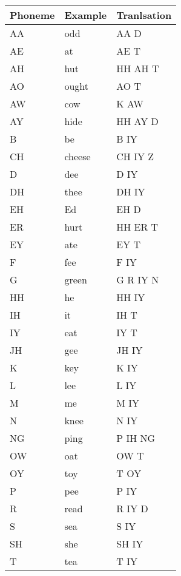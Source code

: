 \begin{table}
    \begin{tabular}{|l|l|l|}
    \hline
    Phoneme & Example & Tranlsation \\ \hline
    AA      & odd     & AA D        \\
    AE      & at      & AE T        \\
    AH      & hut     & HH AH T     \\
    AO      & ought   & AO T        \\
    AW      & cow     & K AW        \\
    AY      & hide    & HH AY D     \\
    B       & be      & B IY        \\
    CH      & cheese  & CH IY Z     \\
    D       & dee     & D IY        \\
    DH      & thee    & DH IY       \\
    EH      & Ed      & EH D        \\
    ER      & hurt    & HH ER T     \\
    EY      & ate     & EY T        \\
    F       & fee     & F IY        \\
    G       & green   & G R IY N    \\
    HH      & he      & HH IY       \\
    IH      & it      & IH T        \\
    IY      & eat     & IY T        \\
    JH      & gee     & JH IY       \\
    K       & key     & K IY        \\
    L       & lee     & L IY        \\
    M       & me      & M IY        \\
    N       & knee    & N IY        \\
    NG      & ping    & P IH NG     \\
    OW      & oat     & OW T        \\
    OY      & toy     & T OY        \\
    P       & pee     & P IY        \\
    R       & read    & R IY D      \\
    S       & sea     & S IY        \\
    SH      & she     & SH IY       \\
    T       & tea     & T IY        \\

\end{tabular}
\end{table}
